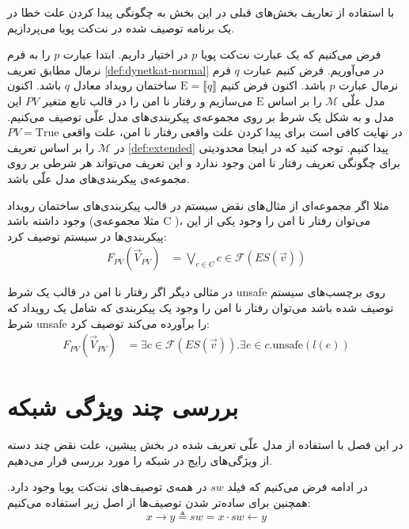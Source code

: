 \documentclass[
msc,
irfonts
]{./tex/tehran-thesis}
\newcommand{\پ}{پروژه/پایان‌نامه/رساله }
\theoremstyle{definition}
\theoremstyle{theorem}
\theoremstyle{definition}
\numberwithin{algorithm}{chapter}
\newcommand{\T}{\mathrm{True}}
\newcommand{\sem}[1]{\llbracket #1 \rrbracket}
\newcommand{\la}{\leftarrow}
\newcommand{\ra}{\rightarrow}
\newcommand{\mc}[1]{\mathcal{#1}}
\newcommand{\mr}[1]{\mathrm{#1}}
\newcommand{\f}[1]{F_{#1}(\vec V_{#1})}
\begin{document}
با استفاده از تعاریف بخش‌های قبلی در این بخش به چگونگی پیدا کردن علت خطا در یک برنامه توصیف شده در نت‌کت پویا می‌پردازیم.

فرض می‌کنیم که یک عبارت نت‌کت پویا
$p$
در اختیار داریم.
ابتدا عبارت
$p$
را به فرم نرمال مطابق تعریف 
\ref{def:dynetkat-normal}
در می‌آوریم.
فرض کنیم عبارت 
$q$
فرم نرمال
عبارت 
$p$
باشد.
اکنون فرض کنیم 
$\mr{E} = \sem{q}$
ساختمان رویداد معادل 
$q$
باشد.
اکنون مدل علّی 
$\mc{M}$
را بر اساس
$\mr{E}$
می‌سازیم و رفتار نا امن را در قالب تابع متغیر
$PV$
این مدل و به شکل یک شرط بر روی مجموعه‌ی پیکربندی‌های مدل علّی توصیف می‌کنیم.
در نهایت کافی است برای پیدا کردن علت واقعی رفتار نا امن، علت واقعی 
$PV = \T$
در 
$\mc{M}$
را بر اساس تعریف 
\ref{def:extended}
پیدا کنیم.
توجه کنید که در اینجا محدودیتی برای چگونگی تعریف رفتار نا امن وجود ندارد و این تعریف می‌تواند هر شرطی بر روی مجموعه‌ی پیکر‌بندی‌های مدل علّی باشد.

مثلا اگر مجموعه‌ای از مثال‌های نقض سیستم در قالب پیکربندی‌های ساختمان رویداد وجود داشته باشد
(مثلا مجموعه‌ی
C
)،
می‌توان رفتار نا امن را وجود یکی از این پیکربندی‌ها در سیستم توصیف کرد:
\begin{align*}
    \f{PV} & = \bigvee_{c \in C} c \in \mc{F}(ES(\vec v))
\end{align*}

در مثالی دیگر اگر رفتار نا امن در قالب یک شرط 
unsafe
روی برچسب‌های سیستم توصیف شده باشد می‌توان رفتار نا امن را وجود یک پیکربندی که شامل یک رویداد که شرط 
unsafe
را برآورده می‌کند توصیف کرد:
\begin{align*}
    \f{PV} & = \exists c \in \mc{F}(ES(\vec v)).\exists e \in c . \text{unsafe}(l(e))
\end{align*}



 
\section{بررسی چند‌ ویژگی شبکه}
در این فصل با استفاده از مدل علّی تعریف شده در بخش پیشین، علت نقض چند دسته از ویژگی‌های رایج در شبکه را مورد بررسی قرار می‌دهیم.

در ادامه فرض‌ می‌کنیم که فیلد
$sw$
در همه‌ی توصیف‌های نت‌کت پویا وجود دارد.
همچنین برای ساده‌تر شدن توصیف‌ها از اصل زیر استفاده می‌کنیم:
\begin{equation*}
    x \ra y \triangleq sw = x \cdot sw \la y
\end{equation*}
\end{document}
